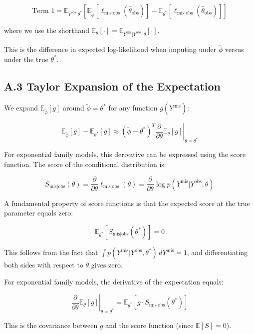 \documentclass[
]{article}
\begin{document}
\[\text{Term 1} = \mathbb{E}_{Y^{\text{obs}}|\theta^*}\left[\mathbb{E}_{\tilde{\phi}}[\ell_{\text{mis}|\text{obs}}(\hat{\theta}_{\text{obs}})] - \mathbb{E}_{\theta^*}[\ell_{\text{mis}|\text{obs}}(\hat{\theta}_{\text{obs}})]\right]\]

where we use the shorthand
\(\mathbb{E}_{\theta}[\cdot] = \mathbb{E}_{Y^{\text{mis}}|Y^{\text{obs}},\theta}[\cdot]\).

This is the difference in expected log-likelihood when imputing under
\(\tilde{\phi}\) versus under the true \(\theta^*\).

\subsection{A.3 Taylor Expansion of the
Expectation}\label{a.3-taylor-expansion-of-the-expectation}

We expand \(\mathbb{E}_{\tilde{\phi}}[g]\) around
\(\tilde{\phi} = \theta^*\) for any function \(g(Y^{\text{mis}})\):

\[\mathbb{E}_{\tilde{\phi}}[g] - \mathbb{E}_{\theta^*}[g] \approx (\tilde{\phi} - \theta^*)^T \left.\frac{\partial}{\partial \theta}\mathbb{E}_{\theta}[g]\right|_{\theta=\theta^*}\]

For exponential family models, this derivative can be expressed using
the score function. The score of the conditional distribution is:

\[S_{\text{mis}|\text{obs}}(\theta) = \frac{\partial}{\partial \theta} \ell_{\text{mis}|\text{obs}}(\theta) = \frac{\partial}{\partial \theta} \log p(Y^{\text{mis}}|Y^{\text{obs}}, \theta)\]

A fundamental property of score functions is that the expected score at
the true parameter equals zero:

\[\mathbb{E}_{\theta^*}[S_{\text{mis}|\text{obs}}(\theta^*)] = 0\]

This follows from the fact that
\(\int p(Y^{\text{mis}}|Y^{\text{obs}}, \theta^*) \, dY^{\text{mis}} = 1\),
and differentiating both sides with respect to \(\theta\) gives zero.

For exponential family models, the derivative of the expectation equals:

\[\left.\frac{\partial}{\partial \theta}\mathbb{E}_{\theta}[g]\right|_{\theta=\theta^*} = \mathbb{E}_{\theta^*}[g \cdot S_{\text{mis}|\text{obs}}(\theta^*)]\]

This is the covariance between \(g\) and the score function (since
\(\mathbb{E}[S] = 0\)).
\end{document}
